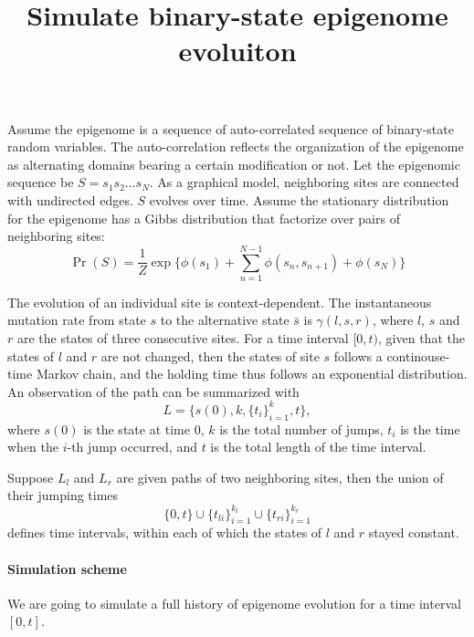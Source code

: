 \documentclass[11pt]{article}
\title{Simulate binary-state epigenome evoluiton}
\begin{document}
\maketitle

Assume the epigenome is a sequence of auto-correlated sequence of
binary-state random variables. The auto-correlation reflects the
organization of the epigenome as alternating domains bearing a certain
modification or not. Let the epigenomic sequence be $S=s_1s_2\ldots
s_N$. As a graphical model, neighboring sites are connected with
undirected edges. $S$ evolves over time. Assume the stationary
distribution for the epigenome has a Gibbs distribution that factorize
over pairs of neighboring sites:
\[
\Pr(S) = \frac{1}{Z} \exp\big\{\phi(s_1) +\sum_{n=1}^{N-1}\phi(s_n, s_{n+1}) + \phi(s_N)\big\}
\]

The evolution of an individual site is context-dependent. The
instantaneous mutation rate from state $s$ to the alternative
state $\bar{s}$ is $\gamma(l, s, r)$, where $l$, $s$ and $r$
are the states of three consecutive sites.  For a time interval $[0,t)$,
given that the states of $l$ and $r$ are not changed, then
the states of site $s$ follows a continouse-time Markov chain, 
and the holding time thus follows an exponential distribution.
An observation of the path can be summarized with
\[
  L = \big\{s(0), k, \{t_i\}_{i=1}^{k}, t \big\},
\]
where $s(0)$ is the state at time 0, $k$ is the total number of jumps,
$t_i$ is the time when the $i$-th jump occurred, and $t$ is the total
length of the time interval.

Suppose $L_l$ and $L_r$ are given paths of two neighboring sites, then
the union of their jumping times
\[
  \{0, t\} \cup \{t_{li}\}_{i=1}^{k_l} \cup \{t_{ri}\}_{i=1}^{k_r} 
\] defines time intervals, within each of which
the states of $l$ and $r$ stayed constant.

\paragraph{Simulation scheme} We are going to simulate
a full history of epigenome evolution for a time interval $[0, t]$.
\end{document}

